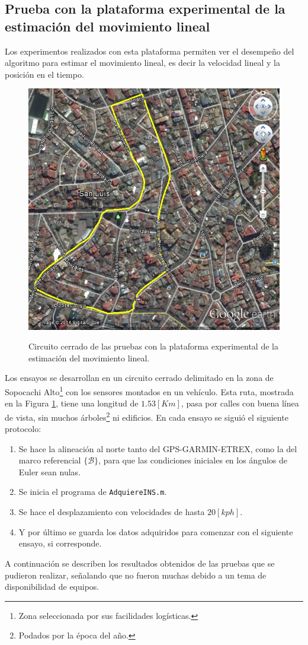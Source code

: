 \documentclass[10pt]{report}
\numberwithin{equation}{chapter}
\numberwithin{algorithm}{chapter}
\newcommand{\marco}[1]{\{\mathcal{#1}\}}
\begin{document}
\subsection{Prueba con la plataforma experimental de la estimación del movimiento lineal}
Los experimentos realizados con esta plataforma permiten ver el desempeño del algoritmo para estimar el movimiento lineal, es decir la velocidad lineal y la posición en el tiempo. \par
\begin{figure}[ht]
\begin{center}
\includegraphics[width=\textwidth]
{pruebas_fig1a.jpg}
\caption{Circuito cerrado de las pruebas con la plataforma experimental de la estimación del movimiento lineal.}
\label{pruebas_fig1}
\end{center}
\end{figure}
Los ensayos se desarrollan en un circuito cerrado delimitado en la zona de Sopocachi Alto\footnote{Zona seleccionada por sus facilidades logísticas.} con los sensores montados en un vehículo. Esta ruta, mostrada en la Figura \ref{pruebas_fig1}, tiene una longitud de $1.53[Km]$, pasa por calles con buena línea de vista, sin muchos árboles\footnote{Podados por la época del año.} ni edificios. En cada ensayo se siguió el siguiente protocolo:	
\begin{enumerate}
\item Se hace la alineación al norte tanto del GPS-GARMIN-ETREX, como la del marco referencial $\marco{B}$, para que las condiciones iniciales en los ángulos de Euler sean nulas.
\item Se inicia el programa de \texttt{AdquiereINS.m}.
\item Se hace el desplazamiento con velocidades de hasta $20[kph]$.
\item Y por último se guarda los datos adquiridos para comenzar con el siguiente ensayo, si corresponde.
\end{enumerate}
A continuación se describen los resultados obtenidos de las pruebas que se pudieron realizar, señalando que no fueron muchas debido a un tema de disponibilidad de equipos.
\end{document}

